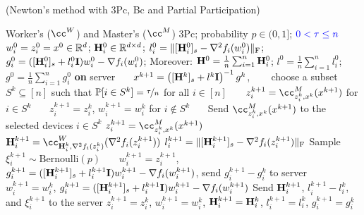 \documentclass[11pt]{article}
\begin{document}
	
	\begin{algorithm}[h!]
		\caption{ (Newton's method with 3Pc, Bc and {\color{blue} Partial Participation})}
		\label{alg:BL2}
		\begin{algorithmic}[1]
			 Worker's ($\cc^W$) and Master's ($\cc^M$) 3Pc; probability $p\in(0, 1]$; ${\color{blue}0<\tau \leq n}$
			$w^0_i = z^0_i = x^0 \in \mathbb{R}^d$; $\mathbf{H}_i^0 \in \mathbb{R}^{d\times d}$; $l_i^0 = \|[\mathbf{H}_i^{0}]_s - \nabla^2 f_i(w_i^{0})\|_{\rm F}$; $g_i^0 = ([\mathbf{H}_i^{0}]_s + l_i^{0} \mathbf{I})w_i^{0} - \nabla f_i(w_i^{0})$; Moreover: $\mathbf{H}^0 = \tfrac{1}{n} \sum_{i=1}^n \mathbf{H}_i^0$; $l^0 = \tfrac{1}{n} \sum_{i=1}^n l_i^0$; $g^0 = \tfrac{1}{n} \sum_{i=1}^n g_i^0$
			\STATE \textbf{on} server
			\STATE ~~~$x^{k+1} = \left(  [\mathbf{H}^k]_s + l^k\mathbf{I}  \right)^{-1} g^k$,
			\STATE ~~~{\color{blue} choose a subset $S^{k} \subseteq [n]$ such that $\mathbb{P}[ i \in S^k] = \nicefrac{\tau}{n}$ for all $i\in [n]$}
			\STATE ~~~$z_i^{k+1} = \cc^M_{z_i^k, x^k} (x^{k+1})$ for $i \in S^k$ 
			\STATE ~~~$z_i^{k+1} = z_i^k$, \quad $w_i^{k+1} = w_i^k$ for $i \notin S^k$ 
			\STATE ~~~Send $\cc^M_{z_i^k, x^k} (x^{k+1})$ to {\color{blue} the selected devices $i\in S^k$} 
			\STATE $z_i^{k+1} = \cc^M_{z_i^k, x^k} (x^{k+1})$
			\STATE $\mH_i^{k+1} = \cc^W_{\mH_i^k, \nabla^2 f_i(z_i^k)} (\nabla^2 f_i(z_i^{k+1}))$ 
			\STATE $l_i^{k+1} = \|[\mathbf{H}_i^{k+1}]_s - \nabla^2 f_i(z_i^{k+1})\|_{\rm F}$ 
			\STATE Sample $\xi_i^{k+1} \sim \text{Bernoulli}(p)$
			\STATE ~~~$w_i^{k+1} = z_i^{k+1}$, $g_i^{k+1} = ([\mathbf{H}_i^{k+1}]_s + l_i^{k+1} \mathbf{I})w_i^{k+1} - \nabla f_i(w_i^{k+1})$, send $g_i^{k+1}-g_i^k$ to server 
			\STATE ~~~$w_i^{k+1} = w_i^k$, $g_i^{k+1} = ([\mathbf{H}_i^{k+1}]_s + l_i^{k+1} \mathbf{I})w_i^{k+1} - \nabla f_i(w_i^{k+1})$ 
			\STATE Send $\mathbf{H}_i^{k+1}$, $l_i^{k+1} - l_i^k$, and $\xi_i^{k+1}$ to the server 
			\STATE $z_i^{k+1} = z_i^k$, $w_i^{k+1} = w_i^k$, $\mathbf{H}_i^{k+1} = \mathbf{H}_i^k$, $l_i^{k+1} = l_i^k$, $g_i^{k+1} = g_i^k$ 
			\ENDFOR
			

\end{algorithmic}
\end{algorithm}
\end{document}
